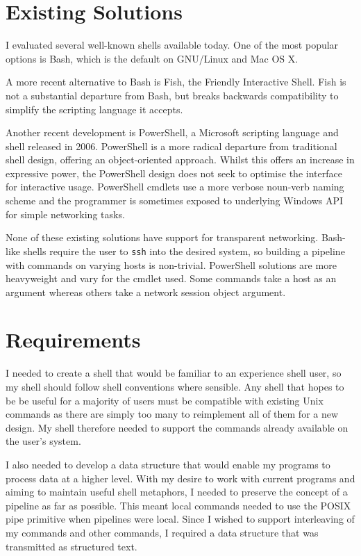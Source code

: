\documentclass[12pt,twoside,notitlepage]{report}
\begin{document}
\section{Existing Solutions}
I evaluated several well-known shells available today. One of the most popular
options is Bash, which is the default on GNU/Linux and Mac OS X.

A more recent alternative to Bash is Fish, the Friendly Interactive Shell. Fish
is not a substantial departure from Bash, but breaks backwards compatibility to
simplify the scripting language it accepts.

Another recent development is PowerShell, a Microsoft scripting language and
shell released in 2006. PowerShell is a more radical departure from traditional
shell design, offering an object-oriented approach. Whilst this offers an
increase in expressive power, the PowerShell design does not seek to optimise
the interface for interactive usage. PowerShell cmdlets use a more verbose
noun-verb naming scheme and the programmer is sometimes exposed to underlying
Windows API for simple networking tasks.

None of these existing solutions have support for transparent
networking. Bash-like shells require the user to {\tt ssh} into the desired
system, so building a pipeline with commands on varying hosts is
non-trivial. PowerShell solutions are more heavyweight and vary for the cmdlet
used. Some commands take a host as an argument whereas others take a network
session object argument.

\section{Requirements}
I needed to create a shell that would be familiar to an experience shell user,
so my shell should follow shell conventions where sensible. Any shell that hopes
to be be useful for a majority of users must be compatible with existing Unix
commands as there are simply too many to reimplement all of them for a new
design. My shell therefore needed to support the commands already available on
the user's system.

I also needed to develop a data structure that would enable my programs to
process data at a higher level. With my desire to work with current programs and
aiming to maintain useful shell metaphors, I needed to preserve the concept of a
pipeline as far as possible. This meant local commands needed to use the POSIX
pipe primitive when pipelines were local. Since I wished to support interleaving
of my commands and other commands, I required a data structure that was
transmitted as structured text.
\end{document}
